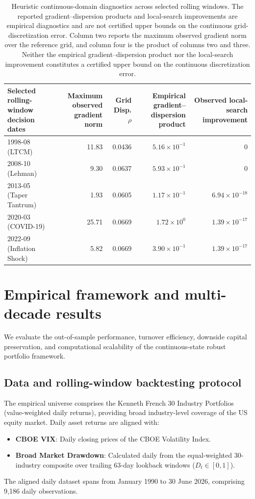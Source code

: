\documentclass[smallextended]{svjour3}
\begin{document}
\begin{table}[htbp]
\centering
\caption{Heuristic continuous-domain diagnostics across selected rolling windows.
The reported gradient--dispersion products and local-search improvements
are empirical diagnostics and are not certified upper bounds on the
continuous grid-discretization error. Column two reports the maximum observed gradient norm over the reference grid, and column four is the product of columns two and three. Neither the empirical gradient--dispersion product nor the local-search improvement constitutes a certified upper bound on the continuous discretization error.}
\label{tab:gap_verification}
\begin{tabular}{lrrrr}
\toprule
\textbf{Selected rolling-window decision dates} & \textbf{Maximum observed gradient norm} & \textbf{Grid Disp. $\rho$} & \textbf{Empirical gradient--dispersion product} & \textbf{Observed local-search improvement} \\
\midrule
1998-08 (LTCM) & 11.83 & 0.0436 & $5.16\times10^{-1}$ & $0$ \\
2008-10 (Lehman) & 9.30 & 0.0637 & $5.93\times10^{-1}$ & $0$ \\
2013-05 (Taper Tantrum) & 1.93 & 0.0605 & $1.17\times10^{-1}$ & $6.94\times10^{-18}$ \\
2020-03 (COVID-19) & 25.71 & 0.0669 & $1.72\times10^{0}$ & $1.39\times10^{-17}$ \\
2022-09 (Inflation Shock) & 5.82 & 0.0669 & $3.90\times10^{-1}$ & $1.39\times10^{-17}$ \\

\bottomrule
\end{tabular}
\end{table}

\section{Empirical framework and multi-decade results}
We evaluate the out-of-sample performance, turnover efficiency, downside capital preservation, and computational scalability of the continuous-state robust portfolio framework.

\subsection{Data and rolling-window backtesting protocol}
The empirical universe comprises the Kenneth French 30 Industry Portfolios \cite{french2026data} (value-weighted daily returns), providing broad industry-level coverage of the US equity market. Daily asset returns are aligned with:
\begin{itemize}
    \item \textbf{CBOE VIX}: Daily closing prices of the CBOE Volatility Index.
    \item \textbf{Broad Market Drawdown}: Calculated daily from the equal-weighted 30-industry composite over trailing 63-day lookback windows ($D_t \in [0, 1]$).
\end{itemize}
The aligned daily dataset spans from January 1990 to 30 June 2026, comprising 9,186 daily observations.
\end{document}
